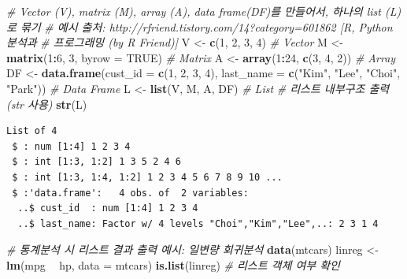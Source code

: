 \documentclass[11pt,a4paper]{book}
\newenvironment{Shaded}{\begin{snugshade}}{\end{snugshade}}
\newcommand{\KeywordTok}[1]{\textcolor[rgb]{0.13,0.29,0.53}{\textbf{#1}}}
\newcommand{\DataTypeTok}[1]{\textcolor[rgb]{0.13,0.29,0.53}{#1}}
\newcommand{\DecValTok}[1]{\textcolor[rgb]{0.00,0.00,0.81}{#1}}
\newcommand{\StringTok}[1]{\textcolor[rgb]{0.31,0.60,0.02}{#1}}
\newcommand{\CommentTok}[1]{\textcolor[rgb]{0.56,0.35,0.01}{\textit{#1}}}
\newcommand{\OtherTok}[1]{\textcolor[rgb]{0.56,0.35,0.01}{#1}}
\newcommand{\OperatorTok}[1]{\textcolor[rgb]{0.81,0.36,0.00}{\textbf{#1}}}
\newcommand{\NormalTok}[1]{#1}
\theoremstyle{definition}
\theoremstyle{definition}
\theoremstyle{definition}
\theoremstyle{remark}
\begin{document}
\footnotesize

\begin{Shaded}
\begin{Highlighting}[]
\CommentTok{# Vector (V), matrix (M), array (A), data frame(DF)를 만들어서, 하나의 list (L)로 묶기}
\CommentTok{# 예시 출처: http://rfriend.tistory.com/14?category=601862 [R, Python 분석과}
\CommentTok{# 프로그래밍 (by R Friend)]}
\NormalTok{V <-}\StringTok{ }\KeywordTok{c}\NormalTok{(}\DecValTok{1}\NormalTok{, }\DecValTok{2}\NormalTok{, }\DecValTok{3}\NormalTok{, }\DecValTok{4}\NormalTok{)  }\CommentTok{# Vector}
\NormalTok{M <-}\StringTok{ }\KeywordTok{matrix}\NormalTok{(}\DecValTok{1}\OperatorTok{:}\DecValTok{6}\NormalTok{, }\DecValTok{3}\NormalTok{, }\DataTypeTok{byrow =} \OtherTok{TRUE}\NormalTok{)  }\CommentTok{# Matrix}
\NormalTok{A <-}\StringTok{ }\KeywordTok{array}\NormalTok{(}\DecValTok{1}\OperatorTok{:}\DecValTok{24}\NormalTok{, }\KeywordTok{c}\NormalTok{(}\DecValTok{3}\NormalTok{, }\DecValTok{4}\NormalTok{, }\DecValTok{2}\NormalTok{))  }\CommentTok{# Array}
\NormalTok{DF <-}\StringTok{ }\KeywordTok{data.frame}\NormalTok{(}\DataTypeTok{cust_id =} \KeywordTok{c}\NormalTok{(}\DecValTok{1}\NormalTok{, }\DecValTok{2}\NormalTok{, }\DecValTok{3}\NormalTok{, }\DecValTok{4}\NormalTok{), }\DataTypeTok{last_name =} \KeywordTok{c}\NormalTok{(}\StringTok{"Kim"}\NormalTok{, }\StringTok{"Lee"}\NormalTok{, }\StringTok{"Choi"}\NormalTok{, }\StringTok{"Park"}\NormalTok{))  }\CommentTok{# Data Frame}
\NormalTok{L <-}\StringTok{ }\KeywordTok{list}\NormalTok{(V, M, A, DF)  }\CommentTok{# List}
\CommentTok{# 리스트 내부구조 출력(str 사용)}
\KeywordTok{str}\NormalTok{(L)}
\end{Highlighting}
\end{Shaded}

\begin{verbatim}
List of 4
 $ : num [1:4] 1 2 3 4
 $ : int [1:3, 1:2] 1 3 5 2 4 6
 $ : int [1:3, 1:4, 1:2] 1 2 3 4 5 6 7 8 9 10 ...
 $ :'data.frame':   4 obs. of  2 variables:
  ..$ cust_id  : num [1:4] 1 2 3 4
  ..$ last_name: Factor w/ 4 levels "Choi","Kim","Lee",..: 2 3 1 4
\end{verbatim}

\begin{Shaded}
\begin{Highlighting}[]
\CommentTok{# 통계분석 시 리스트 결과 출력 예시: 일변량 회귀분석}
\KeywordTok{data}\NormalTok{(mtcars)}
\NormalTok{linreg <-}\StringTok{ }\KeywordTok{lm}\NormalTok{(mpg }\OperatorTok{~}\StringTok{ }\NormalTok{hp, }\DataTypeTok{data =}\NormalTok{ mtcars)}
\KeywordTok{is.list}\NormalTok{(linreg)  }\CommentTok{# 리스트 객체 여부 확인}
\end{Highlighting}
\end{Shaded}
\end{document}

